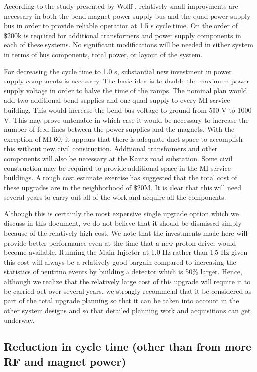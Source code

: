 \documentclass{article}
\begin{document}
According to the study presented by Wolff \cite {Wolff}, relatively small
improvments are necessary in both the bend magnet power supply bus and the
quad power supply bus in order to provide reliable operation at 1.5 s cycle
time. On the order of \$200k is required for additional transformers and
power supply components in each of these systems. No significant modifications
will be needed in either system in terms of bus components, total power, or
layout of the system. 

For decreasing the cycle time to 1.0 s, substantial new investment in power
supply components is necessary. The basic
idea is to double the maximum power supply voltage in order to halve the
time of the ramps. The nominal plan would add two additional bend supplies
and one quad supply to every MI service building. This would increase the
bend bus voltage to ground from 500 V to 1000 V. This may prove untenable 
in which case it would be necessary to increase the number of feed lines
between the power supplies and the magnets. With the exception of MI 60,
it appears that there is adequate duct space to accomplish this without new
civil construction. Additional transformers and other components will also
be necessary at the Kautz road substation. Some civil construction may be
required to provide additional space in the MI service buildings. A rough
cost estimate exercise has suggested that the total cost of these upgrades
are in the neighborhood of \$20M. It is clear that this will need several
years to carry out all of the work and acquire all the components.

Although this is certainly the most expensive single upgrade option which 
we discuss in this document, we do not believe that it should be dismissed
simply because of the relatively high cost. We note that the investments
made here will provide better performance even at the time that a new
proton driver would become available. Running the Main Injector at 1.0 Hz
rather than 1.5 Hz given this cost will always be a relatively good bargain
compared to increasing the statistics of neutrino events by building a
detector which is 50\% larger. Hence, although we realize that the relatively
large cost of this upgrade will require it to be carried out over several
years, we strongly recommend that it be considered as part of the total
upgrade planning so that it can be taken into account in the other system
designs and so that detailed planning work and acquisitions can get underway.

\subsection{Reduction in cycle time (other than from more RF and magnet power)}
\end{document}
